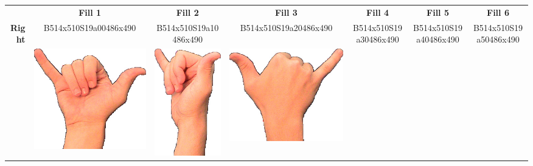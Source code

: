 \documentclass{article}
\begin{document}
\begin{center}
\begin{tabular}{r*{6}{c}}
&\textbf{Fill 1}&\textbf{Fill 2}&\textbf{Fill 3}&\textbf{Fill 4}&\textbf{Fill 5}&\textbf{Fill 6}\\
\multirow{2}{*}{\textbf{Right}}&
B514x510S19a00486x490&
B514x510S19a10486x490&
B514x510S19a20486x490&
B514x510S19a30486x490&
B514x510S19a40486x490&
B514x510S19a50486x490\\
&
\includegraphics[scale=0.1]{images/06-07-1.jpg}&
\includegraphics[scale=0.1]{images/06-07-2.jpg}&
\includegraphics[scale=0.1]{images/06-07-3.jpg}&

\end{tabular}
\end{center}
\end{document}
